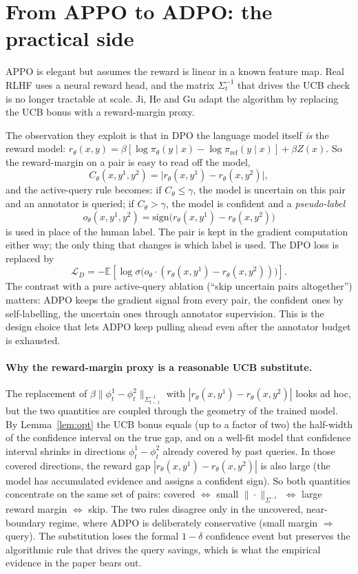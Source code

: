 \documentclass[11pt]{article}
\newcommand{\E}{\mathbb{E}}
\begin{document}
\section{From APPO to ADPO: the practical side}
\label{sec:adpo}

APPO is elegant but assumes the reward is linear in a known feature map. Real RLHF uses a neural reward head, and the matrix $\Sigma_t^{-1}$ that drives the UCB check is no longer tractable at scale. Ji, He and Gu adapt the algorithm by replacing the UCB bonus with a reward-margin proxy.

The observation they exploit is that in DPO the language model itself \emph{is} the reward model: $r_\theta(x, y) = \beta [\log \pi_\theta(y \mid x) - \log \pi_{\mathrm{ref}}(y \mid x)] + \beta Z(x)$. So the reward-margin on a pair is easy to read off the model,
\[
  C_\theta(x, y^1, y^2) = \bigl| r_\theta(x, y^1) - r_\theta(x, y^2) \bigr|,
\]
and the active-query rule becomes: if $C_\theta \le \gamma$, the model is uncertain on this pair and an annotator is queried; if $C_\theta > \gamma$, the model is confident and a \emph{pseudo-label}
\[
  o_\theta(x, y^1, y^2) = \mathrm{sign}\bigl( r_\theta(x, y^1) - r_\theta(x, y^2) \bigr)
\]
is used in place of the human label. The pair is kept in the gradient computation either way; the only thing that changes is which label is used. The DPO loss is replaced by
\[
  \mathcal{L}_D = -\E\!\left[ \log \sigma\!\bigl( o_\theta \cdot (r_\theta(x, y^1) - r_\theta(x, y^2)) \bigr) \right].
\]
The contrast with a pure active-query ablation (``skip uncertain pairs altogether'') matters: ADPO keeps the gradient signal from every pair, the confident ones by self-labelling, the uncertain ones through annotator supervision. This is the design choice that lets ADPO keep pulling ahead even after the annotator budget is exhausted.

\paragraph{Why the reward-margin proxy is a reasonable UCB substitute.}
The replacement of $\beta \|\phi_t^1 - \phi_t^2\|_{\Sigma_{t-1}^{-1}}$ with $|r_\theta(x, y^1) - r_\theta(x, y^2)|$ looks ad hoc, but the two quantities are coupled through the geometry of the trained model. By Lemma~\ref{lem:opt} the UCB bonus equals (up to a factor of two) the half-width of the confidence interval on the true gap, and on a well-fit model that confidence interval shrinks in directions $\phi_t^1 - \phi_t^2$ already covered by past queries. In those covered directions, the reward gap $|r_\theta(x, y^1) - r_\theta(x, y^2)|$ is also large (the model has accumulated evidence and assigns a confident sign). So both quantities concentrate on the same set of pairs: covered $\Leftrightarrow$ small $\|\cdot\|_{\Sigma^{-1}}$ $\Leftrightarrow$ large reward margin $\Leftrightarrow$ skip. The two rules disagree only in the uncovered, near-boundary regime, where ADPO is deliberately conservative (small margin $\Rightarrow$ query). The substitution loses the formal $1 - \delta$ confidence event but preserves the algorithmic rule that drives the query savings, which is what the empirical evidence in the paper bears out.
\end{document}
